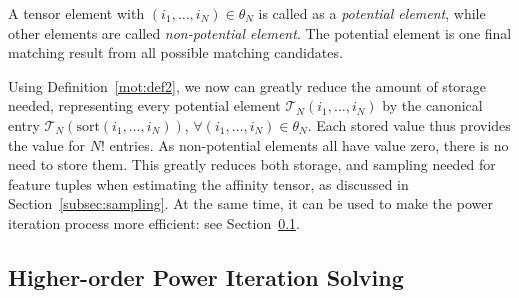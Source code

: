 A tensor element with $(i_1,\ldots,i_N)\in \theta_N$ is called as a \emph{potential element}, while other elements are called \emph{non-potential element}.
The potential element is one final matching result from all possible matching candidates.

Using Definition~\ref{mot:def2}, we now can greatly reduce the amount of storage needed, representing every potential element $\mathcal{T}_N(i_1,\ldots,i_N)$ by the canonical entry $\mathcal{T}_N(\mathrm{sort}(i_1,\ldots,i_N))$, $\forall (i_1,\ldots,i_N)\in \theta_N$. Each stored value thus provides the value for $N!$ entries.
As non-potential elements all have value zero, there is no need to store them.
This greatly reduces both storage, and sampling
needed for feature tuples when estimating the affinity tensor, as discussed in Section~\ref{subsec:sampling}.
At the same time, it can be used to make the power iteration process more efficient: see Section~\ref{subsec:oursymmhopm}.

\subsection{Higher-order Power Iteration Solving}
\label{subsec:oursymmhopm}

